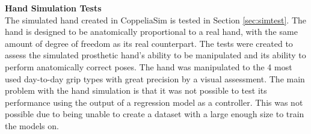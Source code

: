 \documentclass[../main.tex]{subfiles}
\begin{document}
\textbf{Hand Simulation Tests}\\
The simulated hand created in CoppeliaSim \cite{coppeliasim} is tested in Section \ref{sec:simtest}.
The hand is designed to be anatomically proportional to a real hand, with the same amount of degree of freedom as its real counterpart.
The tests were created to assess the simulated prosthetic hand's ability to be manipulated and its ability to perform anatomically correct poses.
The hand was manipulated to the 4 most used day-to-day grip types with great precision by a visual assessment.
The main problem with the hand simulation is that it was not possible to test its performance using the output of a regression model as a controller.
This was not possible due to being unable to create a dataset with a large enough size to train the
models on.




\end{document}
